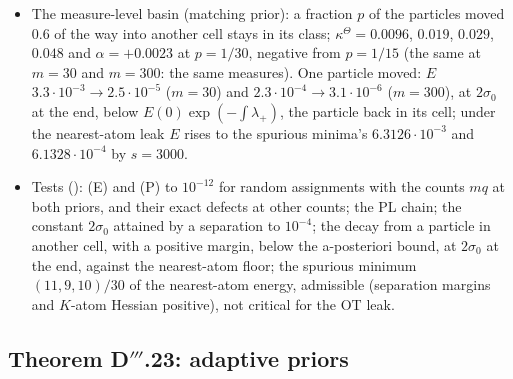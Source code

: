 \begin{itemize}
  \item The measure-level basin (matching prior): a fraction $p$ of the particles moved 0.6 of the way into another
    cell stays in its class; $\kappa^\Theta=0.0096$, $0.019$, $0.029$, $0.048$ and $\alpha=+0.0023$ at $p=1/30$,
    negative from $p=1/15$ (the same at $m=30$ and $m=300$: the same measures). One particle moved: $E$
    $3.3\cdot10^{-3}\to2.5\cdot10^{-5}$ ($m=30$) and $2.3\cdot10^{-4}\to3.1\cdot10^{-6}$ ($m=300$), at $2\sigma_0$
    at the end, below $E(0)\exp(-\int\lambda_+)$, the particle back in its cell; under the nearest-atom leak $E$
    rises to the spurious minima's $6.3126\cdot10^{-3}$ and $6.1328\cdot10^{-4}$ by $s=3000$.
  \item Tests (): (E) and (P) to $10^{-12}$ for random assignments with the counts
    $mq$ at both priors, and their exact defects at other counts; the PL chain; the constant $2\sigma_0$ attained by
    a separation to $10^{-4}$; the decay from a particle in another cell, with a positive margin, below the
    a-posteriori bound, at $2\sigma_0$ at the end, against the nearest-atom floor; the spurious minimum
    $(11,9,10)/30$ of the nearest-atom energy, admissible (separation margins and $K$-atom Hessian positive), not
    critical for the OT leak.
\end{itemize}

\subsection{Theorem D\texorpdfstring{$'''$}{'''}.23: adaptive priors}


